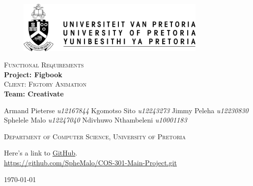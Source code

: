 \begin{titlepage}
	\begin{center}
		
		\begin{figure}[t]
			\centering
			\includegraphics[width=350px]{images/up-logo.jpg}
		\end{figure}
		
		\textsc{\large Functional Requirements} \\ 
		\vspace{2cm}
		\textbf{\Huge Project: Figbook} \\ 
		\textsc{\large Client: Figtory Animation} \\ 
		\vspace{2cm}
		\textbf{\Huge Team: Creativate } \\ 
		
		\begin{flushright} \large
			Armand Pieterse \emph{u12167844} \newline
			Kgomotso Sito 		\emph{u12243273} \newline
			Jimmy Peleha		\emph{u12230830} \newline
			Sphelele Malo 	\emph{u12247040} \newline
			Ndivhuwo Nthambeleni 	\emph{u10001183} \newline
			\end{flushright}
		\textsc{\small Department of Computer Science, University of Pretoria}
		
		\vfill
		
	Here's a link to \href{https://github.com/SpheMalo/COS-301-Main-Project.git}{GitHub}.\\
	\url{https://github.com/SpheMalo/COS-301-Main-Project.git}

	\vfill

	{\large \today}	
	
		
		
	\end{center}
\end{titlepage}

